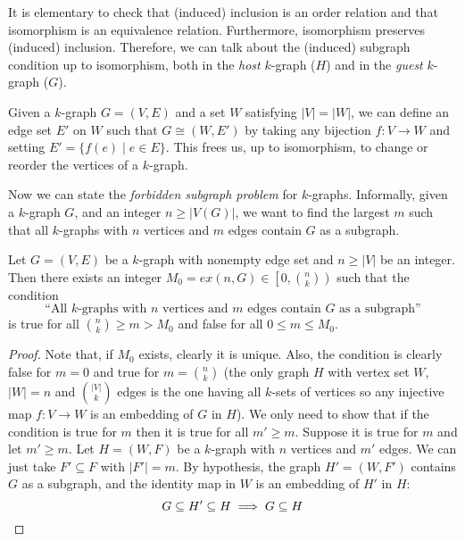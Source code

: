 \begin{remark} %

    It is elementary to check that
    (induced) inclusion is an order relation and that
    isomorphism is an equivalence relation.
    Furthermore, isomorphism preserves (induced) inclusion.
    Therefore, we can talk about the (induced) subgraph
    condition up to isomorphism, both in the \emph{host} $k$-graph
    ($H$) and in the \emph{guest} $k$-graph ($G$).
\end{remark}

\begin{remark} \label{rem:change_vertices}
    Given a $k$-graph $G = (V, E)$ and a set $W$ satisfying $|V| = |W|$,
    we can define an edge set $E'$ on $W$ such that $G \cong (W, E')$
    by taking any bijection $f: V \to W$ and setting $E' = \{f(e) \mid e \in E\}$.
    This frees us, up to isomorphism, to change or reorder
    the vertices of a $k$-graph.
\end{remark}

Now we can state the \emph{forbidden subgraph problem} for $k$-graphs.
Informally, given a $k$-graph $G$, and an integer $n \geq |V(G)|$,
we want to find the largest $m$ such that all $k$-graphs with $n$ vertices and $m$ edges
contain $G$ as a subgraph.

\begin{proposition} \label{prop:extremal}
    Let $G = (V, E)$ be a $k$-graph with nonempty edge set and $n \geq |V|$ be an integer.
    Then there exists an integer $M_0 = ex(n, G) \in \left[ 0, \binom{n}{k}\right)$ such that
    the condition
    \[
        \text{``All $k$-graphs with $n$ vertices and $m$ edges contain $G$ as a subgraph''}
    \]
    is true for all $\binom{n}{k} \geq m > M_0$ and false for all $0 \leq m \leq M_0$.

    \begin{proof}
        Note that, if $M_0$ exists, clearly it is unique.
        Also, the condition is clearly false for $m = 0$ and
        true for $m = \binom{n}{k}$
        (the only graph $H$ with vertex set $W$, $|W|=n$ and $\binom{|V|}{k}$ edges
        is the one having all $k$-sets of vertices so any injective map $f: V \to W$
        is an embedding of $G$ in $H$).
        We only need to show that if the condition is true for $m$ then it is true for
        all $m' \geq m$.
        Suppose it is true for $m$ and let $m' \geq m$.
        Let $H = (W, F)$ be a $k$-graph with $n$ vertices and $m'$ edges.
        We can just take $F' \subseteq F$ with $|F'| = m$.
        By hypothesis, the graph $H' = (W, F')$ contains $G$ as a subgraph,
        and the identity map in $W$ is an embedding of $H'$ in $H$:
        \[
            G \subseteq H' \subseteq H \implies G \subseteq H \qedhere
        \]
    \end{proof}

\end{proposition}

